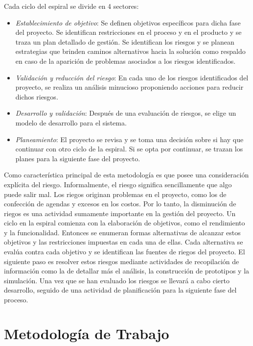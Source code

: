 Cada ciclo del espiral se divide en 4 sectores:
\begin {itemize}
\item \textit{Establecimiento de objetivo}: Se definen objetivos
  específicos para dicha fase del proyecto. Se identifican
  restricciones en el proceso y en el producto y se traza un plan
  detallado de gestión. Se identifican los riesgos y se planean
  estrategias que brinden caminos alternativos hacia la solución como
  respaldo en caso de la aparición de problemas asociados a los
  riesgos identificados.
\item \textit{Validación y reducción del riesgo}: En cada uno de los
  riesgos identificados del proyecto, se realiza un análisis
  minucioso proponiendo acciones para reducir dichos riesgos.
\item \textit{Desarrollo y validación}: Después de una evaluación de
  riesgos, se elige un modelo de desarrollo para el sistema.
\item \textit{Planeamiento}: El proyecto se revisa y se toma una
  decisión sobre si hay que continuar con otro ciclo de la espiral. Si
  se opta por continuar, se trazan los planes para la siguiente fase
  del proyecto.
\end {itemize}

Como característica principal de esta metodología es que posee una
consideración explícita del riesgo. Informalmente, el riesgo significa
sencillamente que algo puede salir mal. Los riegos originan problemas
en el proyecto, como los de confección de agendas y excesos en los
costos. Por lo tanto, la disminución de riegos es una actividad
sumamente importante en la gestión del proyecto. Un ciclo en la
espiral comienza con la elaboración de objetivos, como el rendimiento
y la funcionalidad. Entonces se enumeran formas alternativas de
alcanzar estos objetivos y las restricciones impuestas en cada una de
ellas. Cada alternativa se evalúa contra cada objetivo y se
identifican las fuentes de riegos del proyecto. El siguiente paso es
resolver estos riesgos mediante actividades de recopilación de
información como la de detallar más el análisis, la construcción de
prototipos y la simulación. Una vez que se han evaluado los riesgos se
llevará a cabo cierto desarrollo, seguido de una actividad de
planificación para la siguiente fase del proceso.

\section{Metodología de Trabajo}

